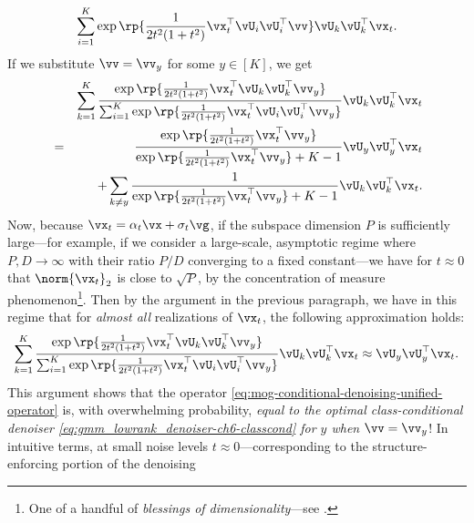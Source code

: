 \documentclass[../../book-main.tex]{subfiles}
\begin{document}
\begin{example}
\begin{equation}
{    }
    {
      \sum_{i
      = 1}^{K}\exp\rp{\frac{1}{2t^{2}(1
      + t^{2})}\vx_t^\top \vU_i \vU_i^\top \vv}
    }
    \vU_{k}\vU_{k}^{\top}\vx_t.
  \end{equation}
  If we substitute $\vv = \vv_y$ for some $y \in [K]$, we get
  \begin{eqnarray}
    &&\sum_{k = 1}^{K}
    \frac{
      \exp\rp{\frac{1}{2t^{2}(1
      + t^{2})}\vx_t^\top \vU_k \vU_k^\top \vv_y}
    }
    {
      \sum_{i
      = 1}^{K}\exp\rp{\frac{1}{2t^{2}(1
      + t^{2})}\vx_t^\top \vU_i \vU_i^\top \vv_y}
    }
    \vU_{k}\vU_{k}^{\top}\vx_t \nonumber \\
    &=& 
    \frac{
      \exp\rp{\frac{1}{2t^{2}(1
      + t^{2})}\vx_t^\top \vv_y}
    }
    {
      \exp\rp{\frac{1}{2t^{2}(1
      + t^{2})}\vx_t^\top \vv_y}
      + K-1
    }
    \vU_{y}\vU_{y}^{\top}\vx_t
    \\
    && +
    \sum_{k \neq y}
    \frac{
      1
    }
    {
      \exp\rp{\frac{1}{2t^{2}(1
      + t^{2})}\vx_t^\top \vv_y}
      + K-1
    }
    \vU_{k}\vU_{k}^{\top}\vx_t.
    \end{eqnarray}
  Now, because $\vx_t = \alpha_t \vx + \sigma_t \vg$, if the subspace dimension
  $P$ is sufficiently large---for example, if we consider a large-scale,
  asymptotic regime where $P, D \to \infty$ with their ratio $P/D$ converging to
  a fixed constant---we have for $t \approx 0$ that $\norm{\vx_t}_2$ is close to
  $\sqrt{P}$, by the concentration of measure phenomenon\footnote{One of
  a handful of \textit{blessings of dimensionality}---see
  \textcite{Wright-Ma-2022}.}. Then
  by the argument in the previous paragraph, we have in this regime that for
  \textit{almost all} realizations of $\vx_t$, the following approximation
  holds:
  \begin{equation}
    \sum_{k = 1}^{K}
    \frac{
      \exp\rp{\frac{1}{2t^{2}(1
      + t^{2})}\vx_t^\top \vU_k \vU_k^\top \vv_y}
    }
    {
      \sum_{i
      = 1}^{K}\exp\rp{\frac{1}{2t^{2}(1
      + t^{2})}\vx_t^\top \vU_i \vU_i^\top \vv_y}
    }
    \vU_{k}\vU_{k}^{\top}\vx_t
    \approx
    \vU_{y}\vU_{y}^{\top}\vx_t.
  \end{equation}
  This argument shows that the operator
  \eqref{eq:mog-conditional-denoising-unified-operator} is, with overwhelming
  probability, \textit{equal to the optimal class-conditional denoiser
  \eqref{eq:gmm_lowrank_denoiser-ch6-classcond} for $y$
  when $\vv = \vv_y$}! In intuitive terms, at small noise levels $t \approx
  0$---corresponding to the structure-enforcing portion of the denoising

\end{example}
\end{document}
